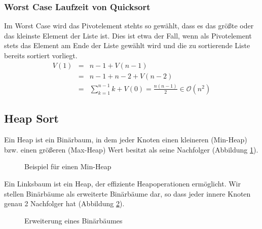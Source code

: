 \subsubsection{Worst Case Laufzeit von Quicksort}
Im Worst Case wird das Pivotelement stehts so gewählt, dass es das größte oder das kleinste Element der Liste ist.
Dies ist etwa der Fall, wenn als Pivotelement stets das Element am Ende der Liste gewählt wird und die zu sortierende Liste bereits sortiert vorliegt.
\begin{eqnarray*}
	V(1) &=& n-1 + V(n-1)	\\
		 &=& n-1 + n-2 + V(n-2)	\\
		 &=& \sum \limits_{k=1}^{n-1} k + V(0) = \frac{n(n-1)}{2} \in \mathcal{O}(n^{2})
\end{eqnarray*}

\subsection{Heap Sort}
Ein Heap ist ein Binärbaum, in dem jeder Knoten einen kleineren (Min-Heap) bzw. einen größeren (Max-Heap) Wert besitzt als seine Nachfolger (Abbildung \ref{fig:MinHeap}).
\begin{figure}[htbp]
	\begin{center}
	\end{center}
	\caption{Beispiel für einen Min-Heap}
	\label{fig:MinHeap}
\end{figure}
Ein Linksbaum ist ein Heap, der effiziente Heapoperationen ermöglicht.
Wir stellen Binär\-bäume als erweiterte Binär\-bäume dar, so dass jeder innere Knoten genau 2 Nachfolger hat  (Abbildung \ref{fig:BinaerBaumExtendet}).
\begin{figure}[htbp]
	\begin{center}
		\hspace{1cm}
	\end{center}
	\caption{Erweiterung eines Binärbäumes}
	\label{fig:BinaerBaumExtendet}
\end{figure}
